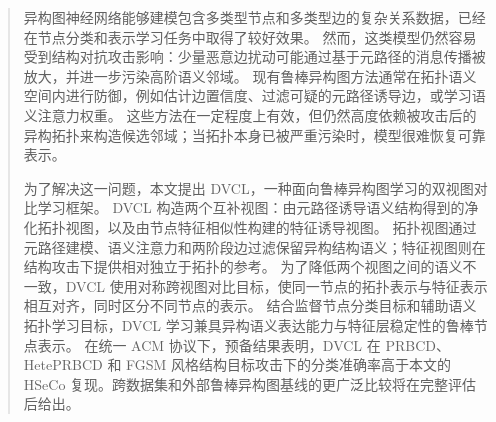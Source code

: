 \begin{abstract}
异构图神经网络能够建模包含多类型节点和多类型边的复杂关系数据，已经在节点分类和表示学习任务中取得了较好效果。
然而，这类模型仍然容易受到结构对抗攻击影响：少量恶意边扰动可能通过基于元路径的消息传播被放大，并进一步污染高阶语义邻域。
现有鲁棒异构图方法通常在拓扑语义空间内进行防御，例如估计边置信度、过滤可疑的元路径诱导边，或学习语义注意力权重。
这些方法在一定程度上有效，但仍然高度依赖被攻击后的异构拓扑来构造候选邻域；当拓扑本身已被严重污染时，模型很难恢复可靠表示。

为了解决这一问题，本文提出 DVCL，一种面向鲁棒异构图学习的双视图对比学习框架。
DVCL 构造两个互补视图：由元路径诱导语义结构得到的净化拓扑视图，以及由节点特征相似性构建的特征诱导视图。
拓扑视图通过元路径建模、语义注意力和两阶段边过滤保留异构结构语义；特征视图则在结构攻击下提供相对独立于拓扑的参考。
为了降低两个视图之间的语义不一致，DVCL 使用对称跨视图对比目标，使同一节点的拓扑表示与特征表示相互对齐，同时区分不同节点的表示。
结合监督节点分类目标和辅助语义拓扑学习目标，DVCL 学习兼具异构语义表达能力与特征层稳定性的鲁棒节点表示。
在统一 ACM 协议下，预备结果表明，DVCL 在 PRBCD、HetePRBCD 和 FGSM 风格结构目标攻击下的分类准确率高于本文的 HSeCo 复现。跨数据集和外部鲁棒异构图基线的更广泛比较将在完整评估后给出。
\end{abstract}
